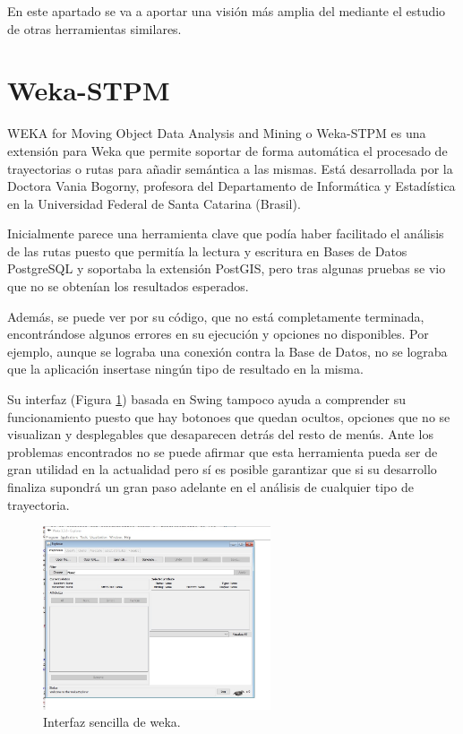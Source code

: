 
En este apartado se va a aportar una visión más amplia del  mediante el estudio de otras herramientas similares.

\section{Weka-STPM}
WEKA for Moving Object Data Analysis and Mining o Weka-STPM es una extensión para Weka que permite soportar de forma automática el procesado de trayectorias o rutas para añadir semántica a las mismas. Está desarrollada por la Doctora Vania Bogorny, profesora del Departamento de Informática y Estadística en la Universidad Federal de Santa Catarina (Brasil).

Inicialmente parece una herramienta clave que podía haber facilitado el análisis de las rutas puesto que permitía la lectura y escritura en Bases de Datos PostgreSQL y soportaba la extensión PostGIS, pero tras algunas pruebas se vio que no se obtenían los resultados esperados.

Además, se puede ver por su código, que no está completamente terminada, encontrándose algunos errores en su ejecución y opciones no disponibles. Por ejemplo, aunque se lograba una conexión contra la Base de Datos, no se lograba que la aplicación insertase ningún tipo de resultado en la misma.

Su interfaz (Figura \ref{weka}) basada en Swing tampoco ayuda a comprender su funcionamiento puesto que hay botonoes que quedan ocultos, opciones que no se visualizan y desplegables que desaparecen detrás del resto de menús. Ante los problemas encontrados no se puede afirmar que esta herramienta pueda ser de gran utilidad en la actualidad pero sí es posible garantizar que si su desarrollo finaliza supondrá un gran paso adelante en el análisis de cualquier tipo de trayectoria.

\begin{figure}[h]
  \centering
    \includegraphics[width=0.6\textwidth]{../img/weka/weka.jpg}
  \caption{Interfaz sencilla de weka.}
  \label{weka}
\end{figure}


